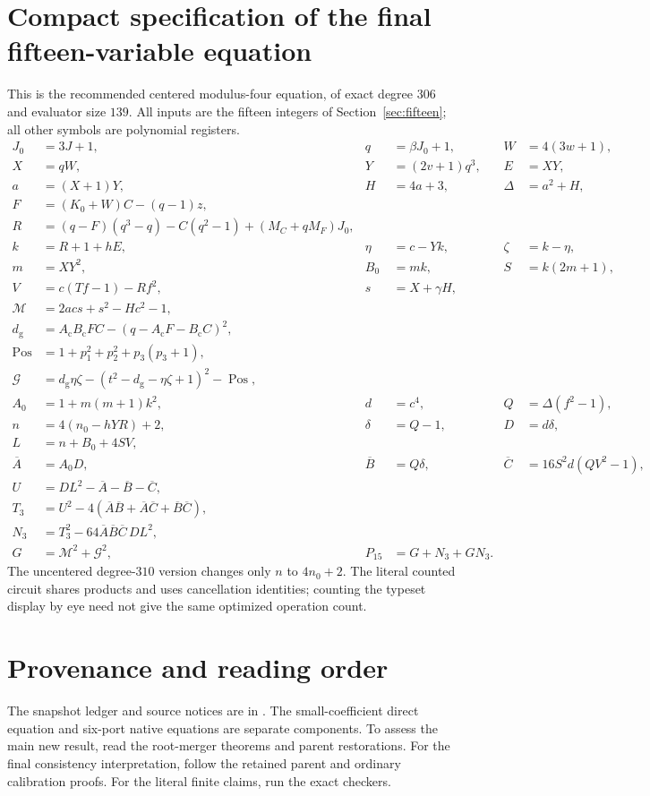 \documentclass[11pt,letterpaper]{article}
\theoremstyle{remark}\newtheorem{remark}[theorem]{Remark}
\newcommand{\Pos}{\operatorname{Pos}}\newcommand{\ZFC}{\operatorname{ZFC}}
\newcommand{\file}[1]{\texttt{\detokenize{#1}}}
\begin{document}
\section{Compact specification of the final fifteen-variable equation}
This is the recommended centered modulus-four equation, of exact degree
$306$ and evaluator size $139$. All inputs are the fifteen integers of
Section~\ref{sec:fifteen}; all other symbols are polynomial registers.
\begin{align*}
 J_0&=3J+1,&q&=\beta J_0+1,&W&=4(3w+1),\\
 X&=qW,&Y&=(2v+1)q^3,&E&=XY,\\
 a&=(X+1)Y,&H&=4a+3,&\Delta&=a^2+H,\\
 F&=(K_0+W)C-(q-1)z,\\
 R&=(q-F)(q^3-q)-C(q^2-1)+(M_C+qM_F)J_0,\\
 k&=R+1+hE,&\eta&=c-Yk,&\zeta&=k-\eta,\\
 m&=XY^2,&B_0&=mk,&S&=k(2m+1),\\
 V&=c(Tf-1)-Rf^2,&s&=X+\gamma H,\\
 \mathcal M&=2acs+s^2-Hc^2-1,\\
 d_{\mathrm g}&=A_{\mathrm c}B_{\mathrm c}FC
                  -(q-A_{\mathrm c}F-B_{\mathrm c}C)^2,\\
 \Pos&=1+p_1^2+p_2^2+p_3(p_3+1),\\
 \mathcal G&=d_{\mathrm g}\eta\zeta
 -(t^2-d_{\mathrm g}-\eta\zeta+1)^2-\Pos,\\
 A_0&=1+m(m+1)k^2,&d&=c^4,&Q&=\Delta(f^2-1),\\
 n&=4(n_0-hYR)+2,&\delta&=Q-1,&D&=d\delta,\\
 L&=n+B_0+4SV,\\
 \overline A&=A_0D,&\overline B&=Q\delta,&
 \overline C&=16S^2d(QV^2-1),\\
 U&=DL^2-\overline A-\overline B-\overline C,\\
 T_3&=U^2-4(\overline A\overline B+
             \overline A\overline C+\overline B\overline C),\\
 N_3&=T_3^2-64\overline A\overline B\overline C\,DL^2,\\
 G&=\mathcal M^2+\mathcal G^2,&P_{15}&=G+N_3+GN_3.
\end{align*}
The uncentered degree-$310$ version changes only $n$ to $4n_0+2$.
The literal counted circuit shares products and uses cancellation
identities; counting the typeset display by eye need not give the same
optimized operation count.

\section{Provenance and reading order}
The snapshot ledger and source notices are in \file{provenance/}.
The small-coefficient direct equation and six-port native equations are
separate components. To assess the main new result, read the root-merger
theorems and parent restorations. For the final consistency interpretation,
follow the retained parent and ordinary calibration proofs. For the
literal finite claims, run the exact checkers.
\end{document}
